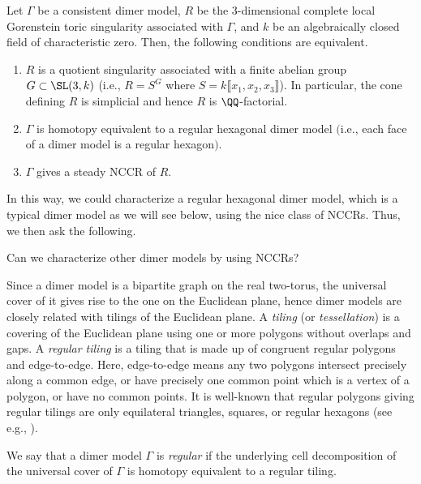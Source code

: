 \begin{theo}\label{dimer}
Let $\Gamma$ be a consistent dimer model, $R$ be the $3$-dimensional complete local Gorenstein toric singularity associated with $\Gamma$, and $k$ be an algebraically closed field of characteristic zero. Then, the following conditions are equivalent.
\begin{enumerate}%
\item $R$ is a quotient singularity associated with a finite abelian group $G\subset\SL(3, k)$ (i.e., $R=S^G$ where $S=k\llbracket x_1,x_2, x_3\rrbracket $). In particular, the cone defining $R$ is simplicial and hence $R$ is $\QQ$-factorial.
\item $\Gamma$ is homotopy equivalent to a regular hexagonal dimer model $($i.e., each face of a dimer model is a regular hexagon$)$.
\item $\Gamma$ gives a steady NCCR of $R$.
\end{enumerate}
\end{theo}

In this way, we could characterize a regular hexagonal dimer model, which is a typical dimer model as we will see below, using the nice class of NCCRs. Thus, we then ask the following.

\begin{ques}\label{que_dimer}
Can we characterize other dimer models by using NCCRs?
\end{ques}

Since a dimer model is a bipartite graph on the real two-torus, the universal cover of it gives rise to the one on the Euclidean plane, hence dimer models are closely related with tilings of the Euclidean plane. A \emph{tiling} (or \emph{tessellation}) is a covering of the Euclidean plane using one or more polygons without overlaps and gaps. A \emph{regular tiling} is a tiling that is made up of congruent regular polygons and edge-to-edge. Here, edge-to-edge means any two polygons intersect precisely along a common edge, or have precisely one common point which is a vertex of a polygon, or have no common points. It is well-known that regular polygons giving regular tilings are only equilateral triangles, squares, or regular hexagons (see e.g., \cite{GS}).

\begin{defi}
We say that a dimer model $\Gamma$ is \emph{regular} if the underlying cell decomposition of the universal cover of $\Gamma$ is homotopy equivalent to a regular tiling.
\end{defi}


